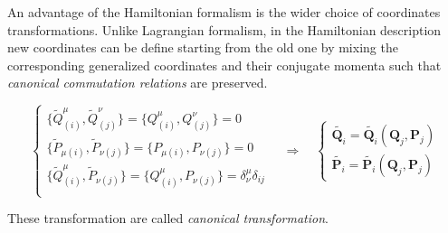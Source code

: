 An advantage of the Hamiltonian formalism is the wider choice of coordinates
transformations. Unlike Lagrangian formalism, in the Hamiltonian description new
coordinates can be define starting from the old one by mixing the corresponding
generalized coordinates and their conjugate momenta such that \emph{canonical
commutation relations} are preserved.

\begin{equation} \label{eq:canonical_transformation}
  \begin{cases}
    \{\tilde{Q}^{\mu}_{(i)}, \tilde{Q}^{\nu}_{(j)}\} =
    \{Q^{\mu}_{(i)}, Q^{\nu}_{(j)}\} = 0 \\
    \{\tilde{P}_{\mu(i)}, \tilde{P}_{\nu(j)}\} =
    \{P_{\mu(i)}, P_{\nu(j)}\} = 0 \\
    \{\tilde{Q}^{\mu}_{(i)}, \tilde{P}_{\nu(j)}\} =
    \{Q^{\mu}_{(i)}, P_{\nu(j)}\} = \delta^{\mu}_{\nu} \delta_{ij}\\
  \end{cases}
  \quad \Rightarrow \quad
  \begin{cases}
    \tilde{\bm{Q}_i} = \tilde{\bm{Q}_i}(\bm{Q}_j, \bm{P}_j) \\
    \tilde{\bm{P}_i} = \tilde{\bm{P}_i}(\bm{Q}_j, \bm{P}_j)
  \end{cases}
\end{equation}

These transformation are called \emph{canonical transformation}.
